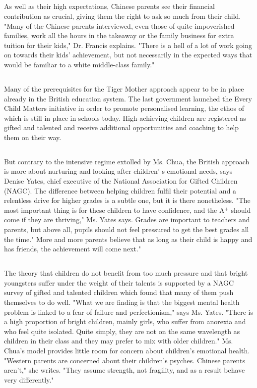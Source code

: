 \documentclass[]{article}
\begin{document}
\begin{spacing}{1.75}
{	\subsection{}
	As well as their high expectations, Chinese parents see their financial contribution as crucial, giving them the right to ask so much from their child. "Many of the Chinese parents interviewed, even those of quite impoverished families, work all the hours in the takeaway or the family business for extra tuition for their kids," Dr. Francis explains. "There is a hell of a lot of work going on towards their kids' achievement, but not necessarily in the expected ways that would be familiar to a white middle-class family."
	\subsection{}
	Many of the prerequisites for the Tiger Mother approach appear to be in place already in the British education system. The last government launched the Every Child Matters initiative in order to promote personalised learning,  the ethos of which is still in place in schools today. High-achieving children are registered as gifted and talented and receive additional opportunities and coaching to help them on their way.
	\subsection{}
	But contrary to the intensive regime extolled by Ms. Chua, the British approach is more about nurturing and looking after children' s emotional needs, says Denise Yates, chief executive of the National Association for Gifted Children (NAGC). The difference between helping children fulfil their potential and a relentless drive for higher grades is a subtle one, but it is there nonetheless. "The most important thing is for these children to have confidence, and the A$^+$ should come if they are thriving," Ms. Yates says.  Grades are important to teachers and parents, but above all, pupils should not feel pressured to get the best grades all the time." More and more parents believe that as long as their child is happy and has friends, the achievement will come next."
	\subsection{}
	The theory that children do not benefit from too much pressure and that bright youngsters suffer under the weight of their talents is supported by a NAGC survey of gifted and talented children which found that many of them push themselves to do well. "What we are finding is that the biggest mental health problem is linked to a fear of failure and perfectionism," says Ms. Yates. "There is a high proportion of bright children, mainly girls, who suffer from anorexia and who feel quite isolated. Quite simply, they are not on the same wavelength as children in their class and they may prefer to mix with older children." Ms. Chua's model provides little room for concern about children's emotional health. "Western parents are concerned about their children's psyches. Chinese parents aren't," she writes. "They assume strength, not fragility, and as a result behave very differently."
}
\end{spacing}
\end{document}
